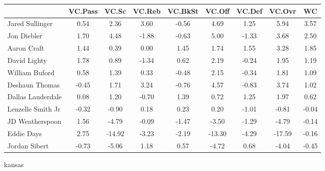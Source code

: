 \documentclass[10pt,letterpaper]{article}
\begin{document}
\begin{table}[ht]
\begin{center}
\begin{tabular}{lcccccccc}
  \hline
 & VC.Pass & VC.Sc & VC.Reb & VC.BkSt & VC.Off & VC.Def & VC.Ovr & WC \\ 
  \hline
Jared Sullinger & 0.54 & 2.36 & 3.60 & -0.56 & 4.69 & 1.25 & 5.94 & 3.57 \\ 
  Jon Diebler & 1.70 & 4.48 & -1.88 & -0.63 & 5.00 & -1.33 & 3.68 & 2.50 \\ 
  Aaron Craft & 1.44 & 0.39 & 0.00 & 1.45 & 1.74 & 1.55 & 3.28 & 1.85 \\ 
  David Lighty & 1.78 & 0.89 & -1.34 & 0.62 & 2.19 & -0.24 & 1.95 & 1.19 \\ 
  William Buford & 0.58 & 1.39 & 0.33 & -0.48 & 2.15 & -0.34 & 1.81 & 1.09 \\ 
  Deshaun Thomas & -0.45 & 1.71 & 3.24 & -0.76 & 4.57 & -0.83 & 3.74 & 1.02 \\ 
  Dallas Lauderdale & 0.08 & 1.20 & -0.70 & 1.39 & 0.72 & 1.25 & 1.97 & 0.62 \\ 
  Lenzelle Smith Jr & -0.32 & -0.90 & 0.18 & 0.23 & 0.20 & -1.01 & -0.81 & -0.04 \\ 
  JD Weatherspoon & 1.56 & -4.79 & -0.09 & -1.47 & -3.50 & -1.29 & -4.79 & -0.14 \\ 
  Eddie Days & 2.75 & -14.92 & -3.23 & -2.19 & -13.30 & -4.29 & -17.59 & -0.16 \\ 
  Jordan Sibert & -0.73 & -5.06 & 1.18 & 0.57 & -4.72 & 0.68 & -4.04 & -0.45 \\ 
   \hline
\end{tabular}
\end{center}
\end{table}
\newpage
\begin{center}
kansas 
\end{center}
\end{document}
